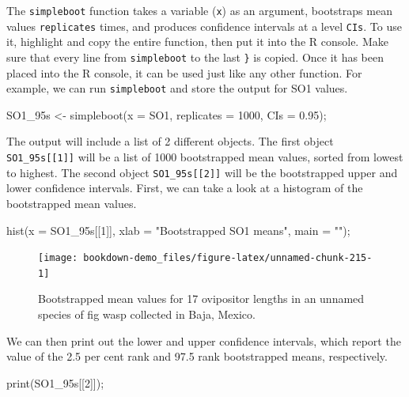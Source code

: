 \documentclass[
]{scrbook}
\newenvironment{Shaded}{\begin{snugshade}}{\end{snugshade}}
\newcommand{\AttributeTok}[1]{\textcolor[rgb]{0.77,0.63,0.00}{#1}}
\newcommand{\DecValTok}[1]{\textcolor[rgb]{0.00,0.00,0.81}{#1}}
\newcommand{\FloatTok}[1]{\textcolor[rgb]{0.00,0.00,0.81}{#1}}
\newcommand{\FunctionTok}[1]{\textcolor[rgb]{0.00,0.00,0.00}{#1}}
\newcommand{\NormalTok}[1]{#1}
\newcommand{\OtherTok}[1]{\textcolor[rgb]{0.56,0.35,0.01}{#1}}
\newcommand{\StringTok}[1]{\textcolor[rgb]{0.31,0.60,0.02}{#1}}
\begin{document}
The \texttt{simpleboot} function takes a variable (\texttt{x}) as an argument, bootstraps mean values \texttt{replicates} times, and produces confidence intervals at a level \texttt{CIs}.
To use it, highlight and copy the entire function, then put it into the R console.
Make sure that every line from \texttt{simpleboot} to the last \texttt{\}} is copied.
Once it has been placed into the R console, it can be used just like any other function.
For example, we can run \texttt{simpleboot} and store the output for SO1 values.

\begin{Shaded}
\begin{Highlighting}[]
\NormalTok{SO1\_95s }\OtherTok{\textless{}{-}} \FunctionTok{simpleboot}\NormalTok{(}\AttributeTok{x =}\NormalTok{ SO1, }\AttributeTok{replicates =} \DecValTok{1000}\NormalTok{, }\AttributeTok{CIs =} \FloatTok{0.95}\NormalTok{);}
\end{Highlighting}
\end{Shaded}

The output will include a list of 2 different objects.
The first object \texttt{SO1\_95s{[}{[}1{]}{]}} will be a list of 1000 bootstrapped mean values, sorted from lowest to highest.
The second object \texttt{SO1\_95s{[}{[}2{]}{]}} will be the bootstrapped upper and lower confidence intervals.
First, we can take a look at a histogram of the bootstrapped mean values.

\begin{Shaded}
\begin{Highlighting}[]
\FunctionTok{hist}\NormalTok{(}\AttributeTok{x =}\NormalTok{ SO1\_95s[[}\DecValTok{1}\NormalTok{]], }\AttributeTok{xlab =} \StringTok{"Bootstrapped SO1 means"}\NormalTok{, }\AttributeTok{main =} \StringTok{""}\NormalTok{);}
\end{Highlighting}
\end{Shaded}

\begin{figure}
\texttt{[image: bookdown-demo\_files/figure-latex/unnamed-chunk-215-1]} \caption{Bootstrapped mean values for 17 ovipositor lengths in an unnamed species of fig wasp collected in Baja, Mexico.}\label{fig:unnamed-chunk-215}
\end{figure}

We can then print out the lower and upper confidence intervals, which report the value of the 2.5 per cent rank and 97.5 rank bootstrapped means, respectively.

\begin{Shaded}
\begin{Highlighting}[]
\FunctionTok{print}\NormalTok{(SO1\_95s[[}\DecValTok{2}\NormalTok{]]);}
\end{Highlighting}
\end{Shaded}
\end{document}
